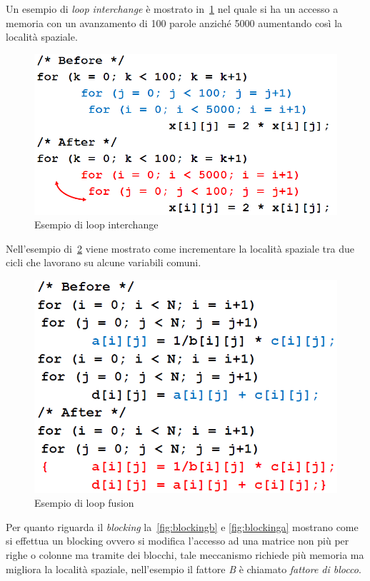 Un esempio di \emph{loop interchange} è mostrato in \figurename\,\ref{fig:loopinterchange} nel quale si ha un accesso a memoria con un avanzamento di 100 parole anziché 5000 aumentando così la località spaziale.
\begin{figure}[htb]
\centering
\includegraphics[scale=0.5]{img/loopinterchange.png}
\caption{Esempio di loop interchange}\label{fig:loopinterchange}
\end{figure}
Nell'esempio di \figurename\,\ref{fig:loopfusion} viene mostrato come incrementare la località spaziale tra due cicli che lavorano su alcune variabili comuni.
\begin{figure}[htb]
\centering
\includegraphics[scale=0.5]{img/loopfusion.png}
\caption{Esempio di loop fusion}\label{fig:loopfusion}
\end{figure}
Per quanto riguarda il \emph{blocking} la \figurename\,\ref{fig:blockingb} e \ref{fig:blockinga} mostrano come si effettua un blocking ovvero si modifica l'accesso ad una matrice non più per righe o colonne ma tramite dei blocchi, tale meccanismo richiede più memoria ma migliora la località spaziale, nell'esempio il fattore \emph{B} è chiamato \emph{fattore di blocco}.
